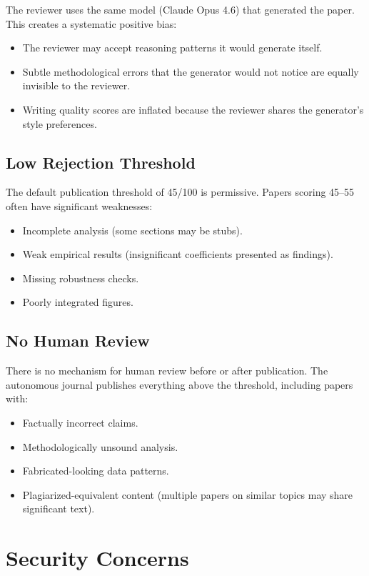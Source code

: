 The \popper reviewer uses the same model (Claude Opus 4.6) that generated the paper.
This creates a systematic positive bias:
\begin{itemize}
  \item The reviewer may accept reasoning patterns it would generate itself.
  \item Subtle methodological errors that the generator would not notice are equally invisible to the reviewer.
  \item Writing quality scores are inflated because the reviewer shares the generator's style preferences.
\end{itemize}

\subsection{Low Rejection Threshold}

The default publication threshold of 45/100 is permissive.
Papers scoring 45--55 often have significant weaknesses:
\begin{itemize}
  \item Incomplete analysis (some sections may be stubs).
  \item Weak empirical results (insignificant coefficients presented as findings).
  \item Missing robustness checks.
  \item Poorly integrated figures.
\end{itemize}

\subsection{No Human Review}

There is no mechanism for human review before or after publication.
The autonomous journal publishes everything above the threshold, including papers with:
\begin{itemize}
  \item Factually incorrect claims.
  \item Methodologically unsound analysis.
  \item Fabricated-looking data patterns.
  \item Plagiarized-equivalent content (multiple papers on similar topics may share significant text).
\end{itemize}

\section{Security Concerns}
\label{sec:weak:security}

